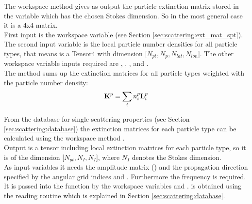 The workspace method  gives as output the
particle extinction matrix  stored in the variable
 which has the chosen Stokes dimension. So in
the most general case it is a 4x4 matrix.\\
First input is the workspace variable  (see Section
\ref{sec:scattering:ext_mat_spt}). The second input variable is the
local particle number densities  for all particle types,
that means  is a Tensor4 with dimension 
[$N_{pt}, N_{p}, N_{lat}, N_{lon}$]. The other workspace variable
inputs required are , ,
, and . \\
The method sums up the extinction matrices for all particle types
weighted with the particle number density:
\begin{eqnarray}
  {\bf K}^{p} = \sum_i n^p_i {\bf L}^{p}_i 
\end{eqnarray}


\label{sec:scattering:ext_mat_gas}

\label{sec:scattering:ext_mat_spt}

From the database for single scattering properties (see Section 
\ref{sec:scattering:database}) the extinction matrices for each
particle type can be calculated using the workspace method
.\\
Output is a tensor including local extinction matrices for each
particle type, so it is of the dimension [$N_{pt}, N_{I}, N_{I}$],
where $N_{I}$ denotes the Stokes dimension.\\
As input variables it needs the amplitude matrix ()
and the propagation direction specified by the angular grid indices
 and . Furthermore the
frequency is required. It is passed into the function by the workspace
variables  and .
 is
obtained using the reading routine  which is
explained in Section \ref{sec:scattering:database}.


